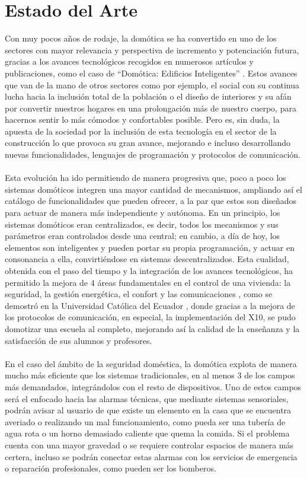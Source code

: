 \chapter{Estado del Arte}

Con muy pocos años de rodaje, la domótica se ha convertido en uno de los sectores con mayor relevancia y perspectiva de incremento y potenciación futura, gracias a los avances tecnológicos recogidos en numerosos artículos y publicaciones, como el caso de “Domótica: Edificios Inteligentes” \cite{EI:2004}. Estos avances que van de la mano de otros sectores como por ejemplo, el social con su continua lucha hacia la inclusión total de la población o el diseño de interiores y su afán por convertir nuestros hogares en una prolongación más de nuestro cuerpo, para hacernos sentir lo más cómodos y confortables posible. Pero es, sin duda, la apuesta de la sociedad por la inclusión de esta tecnología en el sector de la construcción lo que provoca su gran avance, mejorando e incluso desarrollando nuevas funcionalidades, lenguajes de programación y protocolos de comunicación.\\\\
Esta evolución ha ido permitiendo de manera progresiva que, poco a poco los sistemas domóticos integren una mayor cantidad de mecanismos, ampliando así el catálogo de funcionalidades que pueden ofrecer, a la par que estos son diseñados para actuar de manera más independiente y autónoma. En un principio, los sistemas domóticos eran centralizados, es decir, todos los mecanismos y sus parámetros eran controlados desde una central; en cambio, a día de hoy, los elementos son inteligentes y pueden portar su propia programación, y actuar en consonancia a ella, convirtiéndose en sistemas descentralizados. Esta cualidad, obtenida con el paso del tiempo y la integración de los avances tecnológicos, ha permitido la mejora de 4 áreas fundamentales en el control de una vivienda: la seguridad, la gestión energética, el confort y las comunicaciones  \cite{Andes:2011}, como se demostró en la Universidad Católica del Ecuador \cite{Ecuador:2017}, donde gracias a la mejora de los protocolos de comunicación, en especial, la implementación del X10, se pudo domotizar una escuela al completo, mejorando así la calidad de la enseñanza y la satisfacción de sus alumnos y profesores.\\\\
En el caso del ámbito de la seguridad doméstica, la domótica explota de manera mucho más eficiente que los sistemas tradicionales, en al menos 3 de los campos más demandados, integrándolos con el resto de dispositivos. Uno de estos campos será el enfocado hacia las alarmas técnicas, que mediante sistemas sensoriales, podrán avisar al usuario de que existe un elemento en la casa que se encuentra averiado o realizando un mal funcionamiento, como pueda ser una tubería de agua rota o un horno demasiado caliente que quema la comida. Si el problema cuenta con una mayor gravedad o se requiere controlar espacios de manera más certera, incluso se podrán conectar estas alarmas con los servicios de emergencia o reparación profesionales, como pueden ser los bomberos. \\\\
